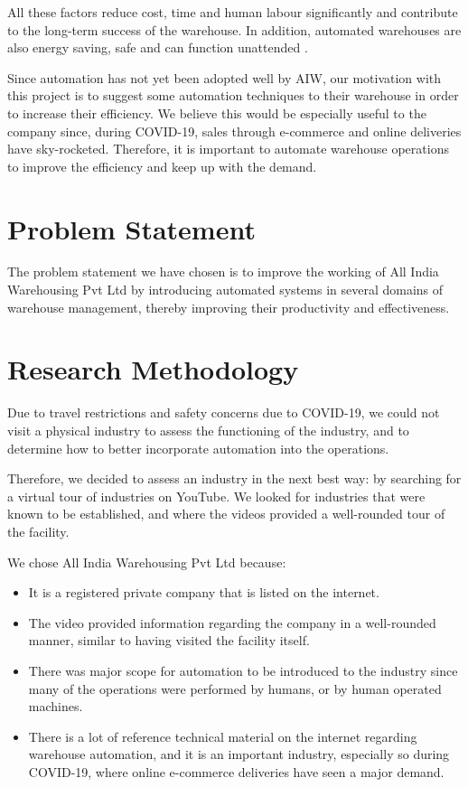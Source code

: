 \documentclass{report}
\begin{document}
All these factors reduce cost, time and human labour significantly and contribute to the long-term success of the warehouse. In addition, automated warehouses are also energy saving, safe and can function unattended \cite{Deng2018DevelopmentOA}. 

Since automation has not yet been adopted well by AIW, our motivation with this project is to suggest some automation techniques to their warehouse in order to increase their efficiency. We believe this would be especially useful to the company since, during COVID-19, sales through e-commerce and online deliveries have sky-rocketed. Therefore, it is important to automate warehouse operations to improve the efficiency and keep up with the demand.

\section{Problem Statement}

The problem statement we have chosen is to improve the working of All India Warehousing Pvt Ltd by introducing automated systems in several domains of warehouse management, thereby improving their productivity and effectiveness.

\section{Research Methodology}

Due to travel restrictions and safety concerns due to COVID-19, we could not visit a physical industry to assess the functioning of the industry, and to determine how to better incorporate automation into the operations.

Therefore, we decided to assess an industry in the next best way: by searching for a virtual tour of industries on YouTube. We looked for industries that were known to be established, and where the videos provided a well-rounded tour of the facility. 

We chose All India Warehousing Pvt Ltd because:

\begin{itemize}
    \item It is a registered private company that is listed on the internet.
    \item The video provided information regarding the company in a well-rounded manner, similar to having visited the facility itself.
    \item There was major scope for automation to be introduced to the industry since many of the operations were performed by humans, or by human operated machines.
    \item There is a lot of reference technical material on the internet regarding warehouse automation, and it is an important industry, especially so during COVID-19, where online e-commerce deliveries have seen a major demand. 
\end{itemize}
\end{document}
